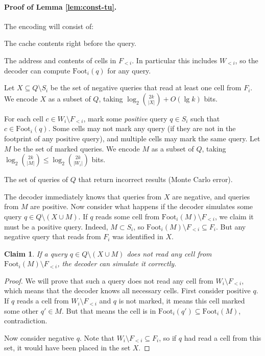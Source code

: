 \documentclass[letterpaper,11pt]{article}
\newenvironment{enumerate*}{\vspace{-1ex}\begin{enumerate}\setlength{\itemsep}{-0.5ex}\setlength{\parsep}{0pt}}{\end{enumerate}}
\newtheorem{claim}[theorem]{Claim}
\newcommand{\foot}{\mathrm{Foot}}
\begin{document}
\paragraph{Proof of Lemma \ref{lem:const-tu}.}
The encoding will consist of:
\begin{enumerate*}
\item The cache contents right before the query. 

\item The address and contents of cells in $F_{<i}$. In particular
  this includes $W_{<i}$, so the decoder can compute $\foot_i(q)$ for
  any query.

\item Let $X\subseteq Q\setminus S_i$ be the set of negative queries
  that read at least one cell from $F_i$. We encode $X$ as a subset of
  $Q$, taking $\log_2 \binom{2k}{|X|} + O(\lg k)$ bits. 

\item For each cell $c \in W_i \setminus F_{<i}$, mark some
  \emph{positive} query $q\in S_i$ such that $c \in \foot_i(q)$. Some
  cells may not mark any query (if they are not in the footprint of
  any positive query), and multiple cells may mark the same
  query. Let $M$ be the set of marked queries. We encode $M$ as a
  subset of $Q$, taking $\log_2 \binom{2k}{|M|} \le \log_2
  \binom{2k}{|W_i|}$ bits.

\item The set of queries of $Q$ that return incorrect results (Monte
  Carlo error).
\end{enumerate*}

\noindent
The decoder immediately knows that queries from $X$ are negative, and
queries from $M$ are positive. Now consider what happens if the
decoder simulates some query $q \in Q \setminus (X \cup M)$. If $q$
reads some cell from $\foot_i(M) \setminus F_{<i}$, we claim it must
be a positive query. Indeed, $M \subset S_i$, so $\foot_i(M) \setminus
F_{<i} \subseteq F_i$. But any negative query that reads from $F_i$
was identified in $X$.

\begin{claim}
If a query $q \in Q \setminus (X \cup M)$ does not read any cell from
$\foot_i(M) \setminus F_{<i}$, the decoder can simulate it correctly.
\end{claim}

\begin{proof}
We will prove that such a query does not read any cell from $W_i
\setminus F_{<i}$, which means that the decoder knows all necessary
cells. First consider positive $q$. If $q$ reads a cell from $W_i
\setminus F_{<i}$ and $q$ is not marked, it means this cell marked
some other $q'\in M$. But that means the cell is in $\foot_i(q')
\subseteq \foot_i(M)$, contradiction.

Now consider negative $q$. Note that $W_i \setminus F_{<i} \subseteq
F_i$, so if $q$ had read a cell from this set, it would have been
placed in the set $X$.
\end{proof}
\end{document}
